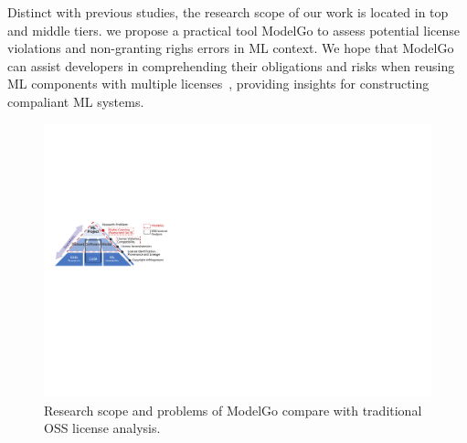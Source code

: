 Distinct with previous studies, the research scope of our work is located in top and middle tiers.
we propose a practical tool ModelGo to assess potential license violations and non-granting righs errors in ML context.
We hope that ModelGo can assist developers in comprehending their obligations and risks when reusing ML components with multiple licenses~\cite{almeida2017software}, providing insights for constructing compaliant ML systems.


\begin{figure}[t]
    \centering
    \includegraphics[width=\linewidth]{fig/pyramid.pdf}
    \caption{Research scope and problems of ModelGo compare with traditional OSS license analysis.}
    \Description{}
    \label{fig:pyramid}
    \vspace{-5mm}
\end{figure}



